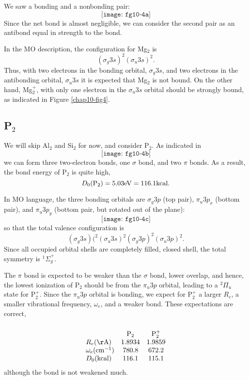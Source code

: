 We saw a bonding and a nonbonding pair:
\begin{equation}
\texttt{[image: fg10-4a]}
\end{equation}
Since the net bond is almost negligible, we can consider the second 
pair as an antibond equal in strength to the bond.

In the MO description, the configuration for Mg$_2$ is
\begin{equation}
\left( \sigma_g 3s \right)^2 \left( \sigma_u 3s \right)^2.
\end{equation}
Thus, with two electrons in the bonding orbital, $\sigma_g 3s$, and two 
electrons in the antibonding orbital, $\sigma_u 3s$ it is expected that 
Mg$_2$ is not
bound.  On the other hand, Mg$_2^+$, with only one electron in the 
$\sigma_u 3s$ orbital should be strongly bound, as indicated in Figure 
\ref{chap10-fig4}.

\subsection{P$_2$}

We will skip Al$_2$ and Si$_2$ for now, and consider P$_2$.  As indicated in
\begin{equation}
\texttt{[image: fg10-4b]}
\end{equation}
we can form three two-electron bonds, one $\sigma$ bond, and two $\pi$ 
bonds.  As a result, the bond energy of P$_2$ is quite high,
\begin{equation}
D_0 ({\rm P}_2) = 5.03 {\rm eV} = 116.1 {\rm kcal}.
\end{equation}

In MO language, the three bonding orbitals are $\sigma_g3p$ (top
pair), $\pi_u 3p_x$ (bottom pair), and $\pi_u 3p_y$ (bottom pair, but
rotated out of the plane):
\begin{equation}
\texttt{[image: fg10-4c]}
\end{equation}
so that the total valence configuration is
\begin{equation}\left( \sigma_g 3s \right)(^2 \left( \sigma_u 3s
\right)^2 \left(\sigma_g 3p \right)^2 \left( \sigma_u 3p \right)^2.
\end{equation}
Since all occupied orbital shells are completely filled, closed shell,
the total symmetry is ${^1\Sigma}^+_g$.

The $\pi$ bond is expected to be weaker than the $\sigma$ bond, lower overlap, 
and hence, the lowest ionization of P$_2$ should be from the $\pi_u 
3p$ orbital, leading
to a ${^2\Pi}_u$ state for P$_2^+$.  Since the $\pi_u3p$ orbital is bonding, we 
expect for P$^+_2$ a larger $R_e$, a smaller 
vibrational frequency, $\omega_e$, and a weaker bond.
These expectations are correct,
\begin{equation}
\begin{array}{lcc} \\
& \mathrm{P}_2 & \mathrm{P}_2^+\\
R_e ( {\rm \AA} ) & 1.8934& 1.9859\cr
\omega_e ( {\rm cm}^{-1} ) & 780.8 & 672.2\cr
D_0 ( {\rm kcal} ) & 116.1& 115.1
\end{array}
\end{equation}
although the bond is not weakened much.

